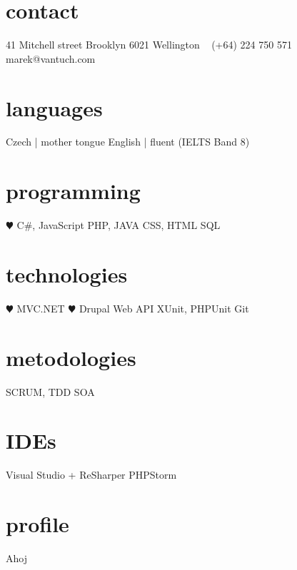 \documentclass[]{friggeri-cv} %
\begin{document}


\begin{aside} %
\section{contact}
41 Mitchell street
Brooklyn
6021 Wellington
~
(+64) 224 750 571
~
marek@vantuch.com
\section{languages}
Czech | mother tongue
English | fluent
(IELTS Band 8)
\section{programming}
{\color{red} $\varheartsuit$} C\#, JavaScript
PHP, JAVA
CSS, HTML
SQL
\section{technologies}
{\color{red} $\varheartsuit$} MVC.NET {\color{red} $\varheartsuit$} Drupal
Web API
XUnit, PHPUnit
Git
\section{metodologies}
SCRUM, TDD
SOA
\section{IDEs}
Visual Studio + ReSharper
PHPStorm
\end{aside}


\section{profile}
Ahoj

\end{document}
